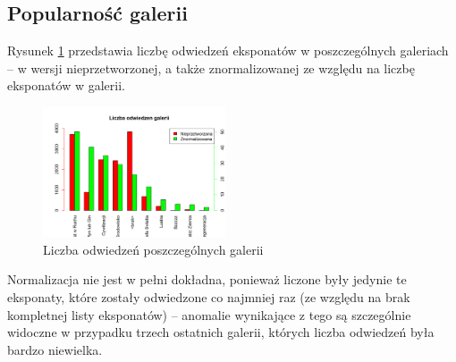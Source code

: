 \documentclass[conference]{IEEEtran}
\begin{document}
\subsection{Popularność galerii}
Rysunek \ref{galerie} przedstawia liczbę odwiedzeń eksponatów w poszczególnych galeriach -- w wersji nieprzetworzonej, a także znormalizowanej ze względu na liczbę eksponatów w galerii.
\begin{figure}[H]
\includegraphics[width=0.48\textwidth]{galerie.png}
\caption{Liczba odwiedzeń poszczególnych galerii}
\label{galerie}
\end{figure}
Normalizacja nie jest w pełni dokładna, ponieważ liczone były jedynie te eksponaty, które zostały odwiedzone co najmniej raz (ze względu na brak kompletnej listy eksponatów) -- anomalie wynikające z tego są szczególnie widoczne w przypadku trzech ostatnich galerii, których liczba odwiedzeń była bardzo niewielka.
\end{document}
